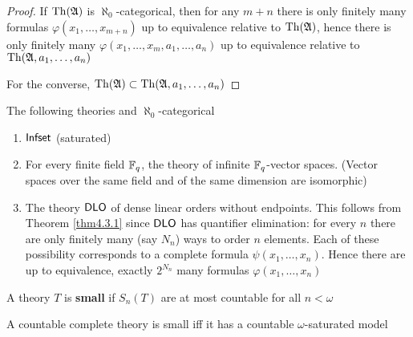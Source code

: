\documentclass[11pt]{article}
\begin{document}
\begin{proof}
If \(\operatorname{Th}(\mathfrak{A})\) is \(\aleph_0\)-categorical, then for any \(m+n\) there is only finitely many
formulas \(\varphi(x_1,\dots,x_{m+n})\) up to equivalence relative to \(\operatorname{Th}(\mathfrak{A})\), hence there is only finitely
many \(\varphi(x_1,\dots,x_m,a_1,\dots,a_n)\) up to equivalence relative to \(\operatorname{Th}(\mathfrak{A},a_1,\dots,a_n)\)

For the converse, \(\operatorname{Th}(\mathfrak{A})\subset\operatorname{Th}(\mathfrak{A},a_1,\dots,a_n)\)
\end{proof}

\begin{examplle}[]
The following theories and \(\aleph_0\)-categorical
\begin{enumerate}
\item \(\operatorname{\textsf{Infset}}\) (saturated)
\item For every finite field \(\mathbb{F}_q\), the theory of infinite \(\mathbb{F}_q\)-vector
spaces. (Vector spaces over the same field and of the same dimension are
isomorphic)
\item The theory \(\operatorname{\textsf{DLO}}\) of dense linear orders without endpoints. This follows
from Theorem \ref{thm4.3.1} since \(\operatorname{\textsf{DLO}}\) has quantifier elimination: for
every \(n\) there are only finitely many (say \(N_n\)) ways to order \(n\)
elements. Each of these possibility corresponds to a complete formula
\(\psi(x_1,\dots,x_n)\). Hence there are up to equivalence, exactly
\(2^{N_n}\) many formulas \(\varphi(x_1,\dots,x_n)\)
\end{enumerate}
\end{examplle}

\begin{definition}[]
A theory \(T\) is \textbf{small} if \(S_n(T)\) are at most countable for all \(n<\omega\)
\end{definition}

\begin{lemma}[]
A countable complete theory is small iff it has a countable
\(\omega\)-saturated model
\end{lemma}
\end{document}
